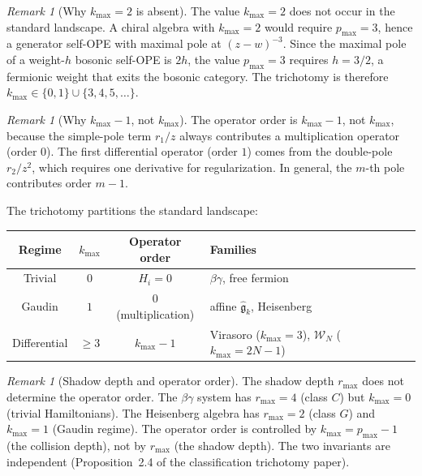 \documentclass[11pt]{article}
\theoremstyle{plain}
\theoremstyle{definition}
\theoremstyle{remark}
\newtheorem{remark}[theorem]{Remark}
\newcommand{\fg}{\mathfrak{g}}
\newcommand{\cW}{\mathcal{W}}
\numberwithin{equation}{section}
\begin{document}
\begin{remark}[Why $k_{\max} = 2$ is absent]
\label{rem:k2-absent}
The value $k_{\max} = 2$ does not occur in the standard landscape.
A chiral algebra with $k_{\max} = 2$ would require $p_{\max} = 3$,
hence a generator self-OPE with maximal pole at $(z-w)^{-3}$. Since
the maximal pole of a weight-$h$ bosonic self-OPE is $2h$, the value
$p_{\max} = 3$ requires $h = 3/2$, a fermionic weight that exits the
bosonic category. The trichotomy is therefore
$k_{\max} \in \{0, 1\} \cup \{3, 4, 5, \ldots\}$.
\end{remark}

\begin{remark}[Why $k_{\max} - 1$, not $k_{\max}$]
\label{rem:order-shift}
The operator order is $k_{\max} - 1$, not $k_{\max}$, because the
simple-pole term $r_1/z$ always contributes a multiplication operator
(order $0$). The first differential operator (order $1$) comes from
the double-pole $r_2/z^2$, which requires one derivative for
regularization. In general, the $m$-th pole contributes order
$m - 1$.
\end{remark}

The trichotomy partitions the standard landscape:

\begin{center}
\renewcommand{\arraystretch}{1.35}
\begin{tabular}{cccl}
\toprule
\textbf{Regime} & $k_{\max}$ & \textbf{Operator order}
 & \textbf{Families} \\
\midrule
Trivial & $0$ & $H_i = 0$
 & $\beta\gamma$, free fermion \\
Gaudin & $1$ & $0$ (multiplication)
 & affine $\widehat{\fg}_k$, Heisenberg \\
Differential & $\geq 3$ & $k_{\max} - 1$
 & Virasoro ($k_{\max}=3$), $\cW_N$ ($k_{\max}=2N-1$) \\
\bottomrule
\end{tabular}
\end{center}

\begin{remark}[Shadow depth and operator order]
\label{warn:shadow-vs-operator}
The shadow depth $r_{\max}$ does not determine the operator order.
The $\beta\gamma$ system has $r_{\max} = 4$ (class $C$) but
$k_{\max} = 0$ (trivial Hamiltonians). The Heisenberg algebra has
$r_{\max} = 2$ (class $G$) and $k_{\max} = 1$ (Gaudin regime). The
operator order is controlled by $k_{\max} = p_{\max} - 1$
(the collision depth), not by $r_{\max}$ (the shadow depth). The
two invariants are independent (Proposition~2.4 of the classification
trichotomy paper).
\end{remark}
\end{document}

